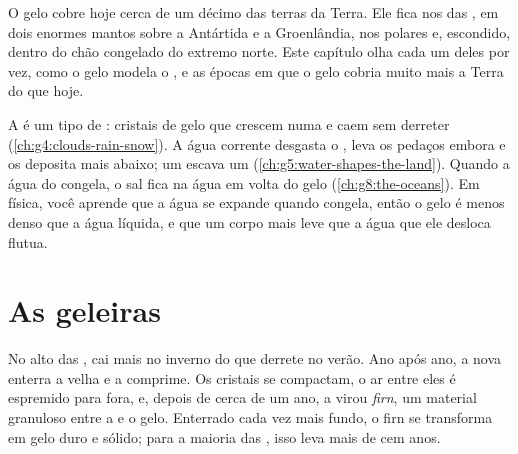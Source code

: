 O gelo cobre hoje cerca de um décimo das terras da Terra. Ele fica nos
 das , em dois enormes mantos sobre a Antártida e a
Groenlândia, nos  polares e, escondido, dentro do chão congelado do
extremo norte. Este capítulo olha cada um deles por vez, como o gelo
modela o , e as épocas em que o gelo cobria muito mais a Terra do
que hoje.

\begin{recall}
A  é um tipo de : cristais de gelo que crescem numa 
e caem sem derreter (\cref{ch:g4:clouds-rain-snow}). A água corrente
desgasta o , leva os pedaços embora e os deposita mais abaixo; um
 escava um  (\cref{ch:g5:water-shapes-the-land}). Quando a água do
 congela, o sal fica na água em volta do gelo (\cref{ch:g8:the-oceans}).
Em física, você aprende que a água se expande quando congela, então o
gelo é menos denso que a água líquida, e que um corpo mais leve que a
água que ele desloca flutua.
\end{recall}

\section{As geleiras}

No alto das , cai mais  no inverno do que derrete no verão.
Ano após ano, a  nova enterra a  velha e a comprime. Os cristais
se compactam, o ar entre eles é espremido para fora, e, depois de cerca de
um ano, a  virou \emph{firn}, um material granuloso entre a  e o
gelo. Enterrado cada vez mais fundo, o firn se transforma em gelo duro e
sólido; para a maioria das , isso leva mais de cem anos.

